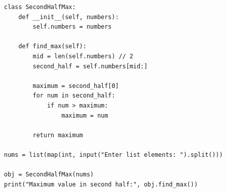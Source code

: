\begin{verbatim}
class SecondHalfMax:
    def __init__(self, numbers):
        self.numbers = numbers

    def find_max(self):
        mid = len(self.numbers) // 2
        second_half = self.numbers[mid:]

        maximum = second_half[0]
        for num in second_half:
            if num > maximum:
                maximum = num

        return maximum

nums = list(map(int, input("Enter list elements: ").split()))

obj = SecondHalfMax(nums)
print("Maximum value in second half:", obj.find_max())
\end{verbatim}
